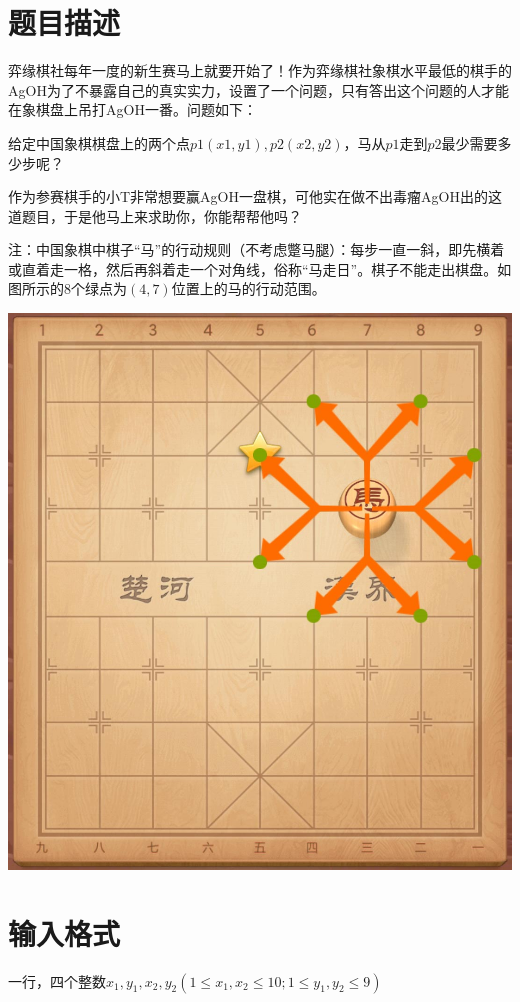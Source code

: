 \documentclass[
	lang=cn,
	color=green
]{elegantbook}
\begin{document}
\section*{题目描述}
弈缘棋社每年一度的新生赛马上就要开始了！作为弈缘棋社象棋水平最低的棋手的AgOH为了不暴露自己的真实实力，设置了一个问题，只有答出这个问题的人才能在象棋盘上吊打AgOH一番。问题如下：

给定中国象棋棋盘上的两个点$p1(x1,y1),p2(x2,y2)$，马从$p1$走到$p2$最少需要多少步呢？

作为参赛棋手的小T非常想要赢AgOH一盘棋，可他实在做不出毒瘤AgOH出的这道题目，于是他马上来求助你，你能帮帮他吗？

注：中国象棋中棋子“马”的行动规则（不考虑蹩马腿）：每步一直一斜，即先横着或直着走一格，然后再斜着走一个对角线，俗称“马走日”。棋子不能走出棋盘。如图所示的$8$个绿点为$(4,7)$位置上的马的行动范围。

\begin{center}
    \includegraphics[scale=0.1]{images/chess.jpg}
\end{center}

\section*{输入格式}
一行，四个整数$x_1,y_1,x_2,y_2(1 \leq x_1,x_2 \leq 10; 1 \leq y_1,y_2 \leq 9)$
\end{document}
